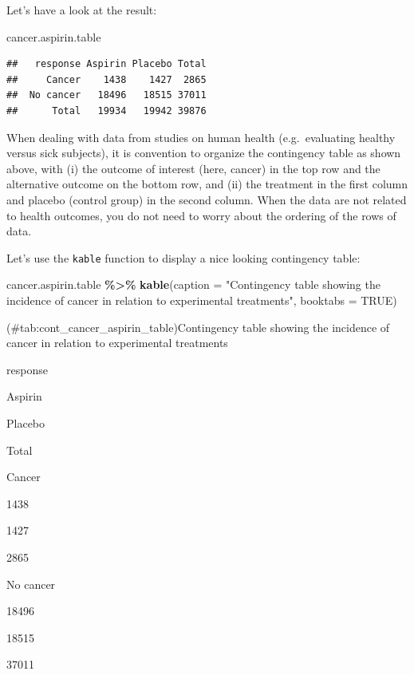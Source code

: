 \documentclass[
]{book}
\newenvironment{Shaded}{\begin{snugshade}}{\end{snugshade}}
\newcommand{\AttributeTok}[1]{\textcolor[rgb]{0.13,0.29,0.53}{#1}}
\newcommand{\ConstantTok}[1]{\textcolor[rgb]{0.56,0.35,0.01}{#1}}
\newcommand{\FunctionTok}[1]{\textcolor[rgb]{0.13,0.29,0.53}{\textbf{#1}}}
\newcommand{\NormalTok}[1]{#1}
\newcommand{\SpecialCharTok}[1]{\textcolor[rgb]{0.81,0.36,0.00}{\textbf{#1}}}
\newcommand{\StringTok}[1]{\textcolor[rgb]{0.31,0.60,0.02}{#1}}
\begin{document}
Let's have a look at the result:

\begin{Shaded}
\begin{Highlighting}[]
\NormalTok{cancer.aspirin.table}
\end{Highlighting}
\end{Shaded}

\begin{verbatim}
##   response Aspirin Placebo Total
##     Cancer    1438    1427  2865
##  No cancer   18496   18515 37011
##      Total   19934   19942 39876
\end{verbatim}

When dealing with data from studies on human health (e.g.~evaluating healthy versus sick subjects), it is convention to organize the contingency table as shown above, with (i) the outcome of interest (here, cancer) in the top row and the alternative outcome on the bottom row, and (ii) the treatment in the first column and placebo (control group) in the second column. When the data are not related to health outcomes, you do not need to worry about the ordering of the rows of data.

Let's use the \texttt{kable} function to display a nice looking contingency table:

\begin{Shaded}
\begin{Highlighting}[]
\NormalTok{cancer.aspirin.table }\SpecialCharTok{\%\textgreater{}\%}
  \FunctionTok{kable}\NormalTok{(}\AttributeTok{caption =} \StringTok{"Contingency table showing the incidence of cancer in relation to experimental treatments"}\NormalTok{, }\AttributeTok{booktabs =} \ConstantTok{TRUE}\NormalTok{)}
\end{Highlighting}
\end{Shaded}

(\#tab:cont\_cancer\_aspirin\_table)Contingency table showing the incidence of cancer in relation to experimental treatments

response

Aspirin

Placebo

Total

Cancer

1438

1427

2865

No cancer

18496

18515

37011
\end{document}
